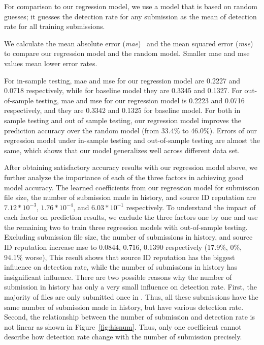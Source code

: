 For comparison to our regression model, we use a model that is based on random guesses;
it guesses the detection rate for any submission 
as the mean of detection rate for all training submissions. 

We calculate the mean absolute error ({\em mae})~\cite{mae} 
and the mean squared error ({\em mse})~\cite{mse} to compare our regression model and the random model. 
Smaller mae and mse values mean lower error rates. 

For in-sample testing, mae and mse for our regression model are 0.2227 and 0.0718 respectively, 
while for baseline model they are 0.3345 and 0.1327. 
For out-of-sample testing, mae and mse for our regression model is 0.2223 and 0.0716 respectively, 
and they are 0.3342 and 0.1325 for baseline model. 
For both in sample testing and out of sample testing, our regression model %
improves the prediction accuracy over the random model (from 33.4\% to 46.0\%).
Errors of our regression model under in-sample testing and out-of-sample testing are almost the same, 
which shows that our model generalizes well across different data set. 

After obtaining satisfactory accuracy results with our regression model above, 
we further analyze the importance of each of the three factors in achieving good model accuracy.
The learned coefficients from our regression model for submission file size, the number of submission made in history, and source ID reputation 
are $7.12 * 10^{-3}$, $1.76 * 10^{-4}$, and $6.03 * 10^{-1}$ respectively. 
To understand the impact of each factor on prediction results, 
we exclude the three factors one by one and use the remaining two to train 
three regression models with out-of-sample testing. 
Excluding submission file size, the number of submissions in history, and source ID reputation increase mse 
to 0.0844, 0.716, 0.1390 respectively (17.9\%, 0\%, 94.1\% worse), 
This result shows that source ID reputation has the biggest influence on detection rate, 
while the number of submissions in history has insignificant influence.
There are two possible reasons why the number of submission in history has only a very small influence on detection rate. 
First, the majority of files are only submitted once in \vt. Thus, all these submissions have the same number of submission made in history, but have various detection rate. 
Second, the relationship between the number of submission and detection rate is not linear as shown in Figure~\ref{fig:hisnum}.
Thus, only one coefficient cannot describe how detection rate change with the number of submission precisely. 


